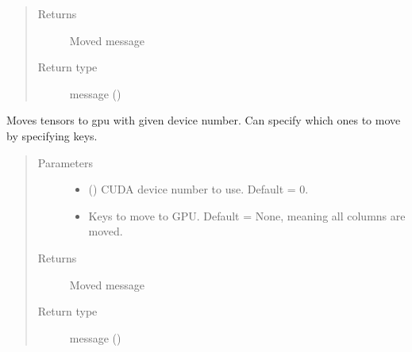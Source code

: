 \documentclass[letterpaper,10pt,english]{sphinxmanual}
\begin{document}
\begin{fulllineitems}
\begin{fulllineitems}
\begin{quote}
\begin{description}
\item[{Returns}] \leavevmode
Moved message

\item[{Return type}] \leavevmode
message ({\hyperref[\detokenize{Fireworks:Fireworks.core.message.Message}]{}})

\end{description}\end{quote}

\end{fulllineitems}


\begin{fulllineitems}
\label{\detokenize{Fireworks:Fireworks.core.message.Message.cuda}}
Moves tensors to gpu with given device number. Can specify which ones to move by specifying keys.
\begin{quote}\begin{description}
\item[{Parameters}] \leavevmode\begin{itemize}
\item {} 
 () \textendash{} CUDA device number to use. Default = 0.

\item {} 
 \textendash{} Keys to move to GPU. Default = None, meaning all columns are moved.

\end{itemize}

\item[{Returns}] \leavevmode
Moved message

\item[{Return type}] \leavevmode
message ({\hyperref[\detokenize{Fireworks:Fireworks.core.message.Message}]{}})

\end{description}\end{quote}

\end{fulllineitems}


\end{fulllineitems}

\end{document}
